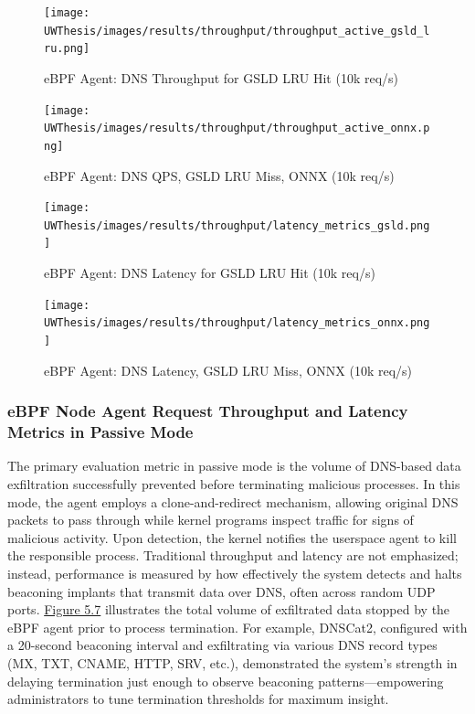 \documentclass [11pt, proquest] {uwthesis}[2020/02/24]
\begin{document}
\begin{figure}[H]
  \centering
  \begin{minipage}[t]{0.47\textwidth}
    \centering
    \texttt{[image: UWThesis/images/results/throughput/throughput\_active\_gsld\_lru.png]}
    \caption{eBPF Agent: DNS Throughput for GSLD LRU Hit (10k req/s)}
    \label{fig:throughput_gsld}
  \end{minipage}
  \hfill
  \begin{minipage}[t]{0.47\textwidth}
    \centering
    \texttt{[image: UWThesis/images/results/throughput/throughput\_active\_onnx.png]}
    \caption{eBPF Agent: DNS QPS, GSLD LRU Miss, ONNX (10k req/s)}
    \label{fig:throughput_onnx}
  \end{minipage}

  \vspace{1cm} %

  \begin{minipage}[t]{0.47\textwidth}
    \centering
    \texttt{[image: UWThesis/images/results/throughput/latency\_metrics\_gsld.png]}
    \caption{eBPF Agent: DNS Latency for GSLD LRU Hit (10k req/s)}
    \label{fig:latency_gsld}
  \end{minipage}
  \hfill
  \begin{minipage}[t]{0.47\textwidth}
    \centering
    \texttt{[image: UWThesis/images/results/throughput/latency\_metrics\_onnx.png]}
    \caption{eBPF Agent: DNS Latency, GSLD LRU Miss, ONNX (10k req/s)}
    \label{fig:latency_onnx}
  \end{minipage}
\end{figure}

\subsubsection{eBPF Node Agent Request Throughput and Latency Metrics in Passive Mode}
The primary evaluation metric in passive mode is the volume of DNS-based data exfiltration successfully prevented before terminating malicious processes. In this mode, the agent employs a clone-and-redirect mechanism, allowing original DNS packets to pass through while kernel programs inspect traffic for signs of malicious activity. Upon detection, the kernel notifies the userspace agent to kill the responsible process. Traditional throughput and latency are not emphasized; instead, performance is measured by how effectively the system detects and halts beaconing implants that transmit data over DNS, often across random UDP ports. \hyperref[fig:data_loss_prev]{Figure 5.7} illustrates the total volume of exfiltrated data stopped by the eBPF agent prior to process termination. For example, DNSCat2, configured with a 20-second beaconing interval and exfiltrating via various DNS record types (MX, TXT, CNAME, HTTP, SRV, etc.), demonstrated the system’s strength in delaying termination just enough to observe beaconing patterns—empowering administrators to tune termination thresholds for maximum insight.
\end{document}
